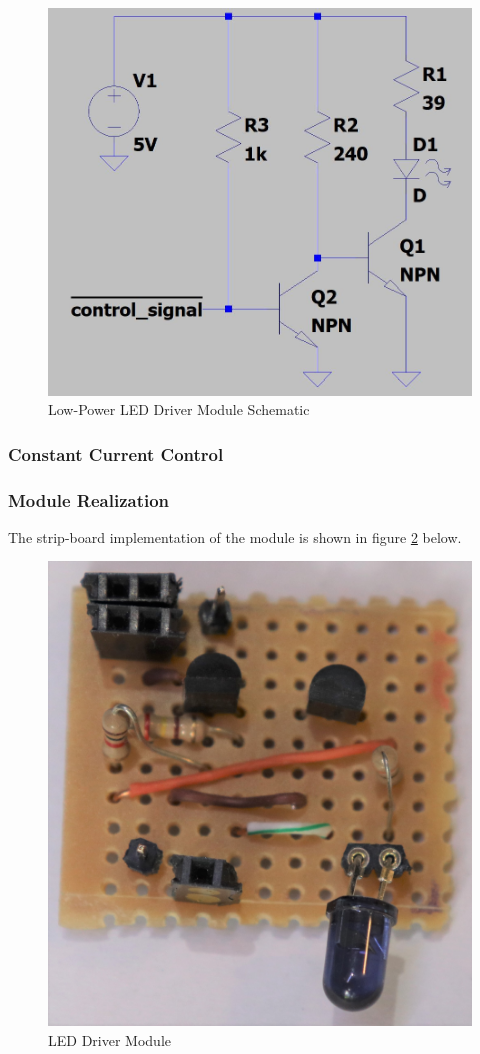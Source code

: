 \begin{figure}[H]
	\centering
	\includegraphics[width=.6\textwidth]{figures/design/low_power_led_driver.JPG}
	\caption{Low-Power LED Driver Module Schematic}
	\label{fig:schematic_low_power_led_driver}
\end{figure}

\subsubsection{Constant Current Control}



\subsubsection{Module Realization}
The strip-board implementation of the module is shown in figure \ref{fig:module_led_driver} below.

\begin{figure}[H]
	\centering
	\includegraphics[width=.6\textwidth]{figures/modules/led_driver.jpg}
	\caption{LED Driver Module}
	\label{fig:module_led_driver}
\end{figure}




